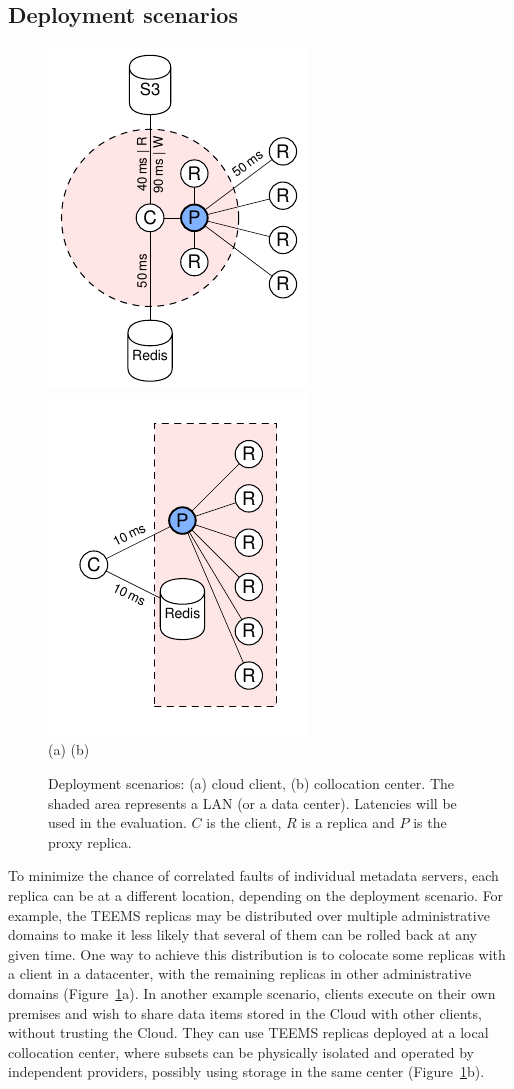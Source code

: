 \subsection{Deployment scenarios}

\begin{figure}[t] \centering
        \includegraphics[width=.32\linewidth]{ps/diag-2}
        \includegraphics[width=.32\linewidth]{ps/diag-3}\\
        (a) \hspace{2.7cm} (b)
    \caption{Deployment scenarios: (a) cloud client, (b) collocation center. The shaded area represents a
    LAN (or a data center). Latencies will be used in the evaluation.
    $C$ is the client, $R$ is a replica and $P$ is the proxy replica.
    }\label{fig:deployments}
\end{figure}


To minimize the chance of correlated faults of individual metadata
servers, each replica can be at a different location, depending on the
deployment scenario. For example, the \ac{TEEMS} replicas may be
distributed over multiple administrative domains to make it less
likely that several of them can be rolled back at any given time. One
way to achieve this distribution is to colocate some replicas with a
client in a datacenter, with the remaining replicas in other
administrative domains (Figure~\ref{fig:deployments}a).  In another
example scenario, clients execute on their own premises and wish to
share data items stored in the Cloud with other clients, without
trusting the Cloud. They can use \ac{TEEMS} replicas deployed at a local
collocation center, where subsets can be physically isolated and
operated by independent providers, possibly using storage in the same
center (Figure~\ref{fig:deployments}b).

